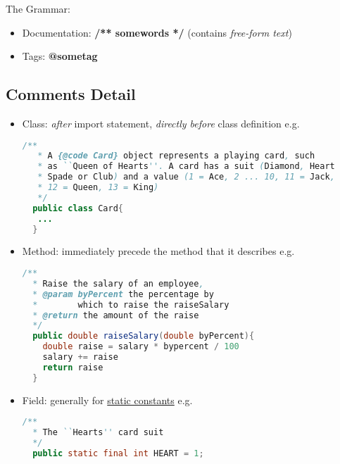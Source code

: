 \documentclass[12pt]{article}
\begin{document}
The Grammar:
\begin{itemize}
    \item Documentation: \textbf{/** somewords */} (contains \textit{free-form text})
    \item Tags: \textbf{@sometag}
\end{itemize}

\subsection{Comments Detail}
\begin{itemize}
    \item Class: \textit{after} import statement, \textit{directly before} class definition\newline
    e.g.
    \begin{lstlisting}[language=Java]
 /**
   * A {@code Card} object represents a playing card, such
   * as ``Queen of Hearts''. A card has a suit (Diamond, Heart
   * Spade or Club) and a value (1 = Ace, 2 ... 10, 11 = Jack,
   * 12 = Queen, 13 = King)
   */
  public class Card{
   ...
  }
    \end{lstlisting}

    \item Method: immediately precede the method that it describes\newline 
    e.g.
    \begin{lstlisting}[language=Java]
 /**
  * Raise the salary of an employee,
  * @param byPercent the percentage by 
  *        which to raise the raiseSalary
  * @return the amount of the raise
  */
  public double raiseSalary(double byPercent){
    double raise = salary * bypercent / 100
    salary += raise
    return raise
  }
    \end{lstlisting}

    \item Field: generally for \underline{static constants}\newline
    e.g.
    \begin{lstlisting}[language=Java]
 /**
  * The ``Hearts'' card suit
  */
  public static final int HEART = 1;
    \end{lstlisting}
\end{itemize}
 
\end{document}
